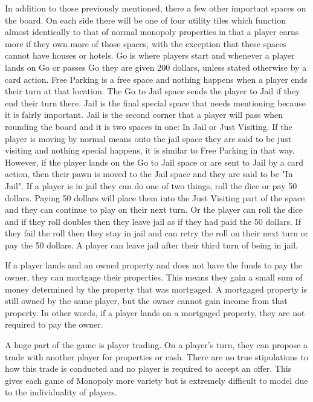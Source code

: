 \documentclass{article}
\begin{document}
In addition to those previously mentioned, there a few other important spaces on the board.  On each side there will be one of four utility tiles which function almost identically to that of normal monopoly properties in that a player earns more if they own more of those spaces, with the exception that these spaces cannot have houses or hotels.  Go is where players start and whenever a player lands on Go or passes Go they are given 200 dollars, unless stated otherwise by a card action.  Free Parking is a free space and nothing happens when a player ends their turn at that location.  The Go to Jail space sends the player to Jail if they end their turn there.  Jail is the final special space that needs mentioning because it is fairly important.  Jail is the second corner that a player will pass when rounding the board and it is two spaces in one: In Jail or Just Visiting.  If the player is moving by normal means onto the jail space they are said to be just visiting and nothing special happens, it is similar to Free Parking in that way. However, if the player lands on the Go to Jail space or are sent to Jail by a card action, then their pawn is moved to the Jail space and they are said to be "In Jail".  If a player is in jail they can do one of two things, roll the dice or pay 50 dollars.  Paying 50 dollars will place them into the Just Visiting part of the space and they can continue to play on their next turn.  Or the player can roll the dice and if they roll doubles then they leave jail as if they had paid the 50 dollars.  If they fail the roll then they stay in jail and can retry the roll on their next turn or pay the 50 dollars.  A player can leave jail after their third turn of being in jail.\cite{rules}
	
If a player lands and an owned property and does not have the funds to pay the owner, they can mortgage their properties.  This means they gain a small sum of money determined by the property that was mortgaged.  A mortgaged property is still owned by the same player, but the owner cannot gain income from that property. In other words, if a player lands on a mortgaged property, they are not required to pay the owner.\cite{rules}

A huge part of the game is player trading.  On a player’s turn, they can propose a trade with another player for properties or cash.  There are no true stipulations to how this trade is conducted and no player is required to accept an offer.  This gives each game of Monopoly more variety but is extremely difficult to model due to the individuality of players.
\end{document}
